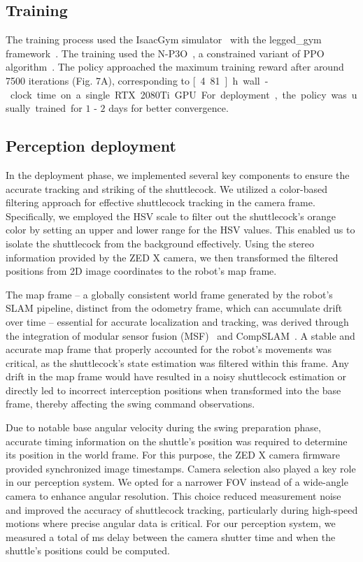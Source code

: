 \documentclass[9pt,twocolumn,twoside]{osajnl}
\begin{document}
\subsection*{Training}
The training process used the IsaacGym simulator~\cite{makoviychuk2021isaac} with the legged\_gym framework~\cite{makoviychuk2021isaac, rudin2022learning}. The training used the \ac{N-P3O}~\cite{lee2023evaluation}, a constrained variant of \ac{PPO} algorithm~\cite{schulman2017proximalpolicyoptimizationalgorithms}. The policy approached the maximum training reward after around 7500 iterations (Fig. 7A), corresponding to \unit[4.81]{h} wall-clock time on a single RTX 2080Ti GPU. For deployment, the policy was usually trained for $1$ - $2$ days for better convergence.

\subsection*{Perception deployment}
In the deployment phase, we implemented several key components to ensure the accurate tracking and striking of the shuttlecock. We utilized a color-based filtering approach for effective shuttlecock tracking in the camera frame. Specifically, we employed the \ac{HSV} scale to filter out the shuttlecock's orange color by setting an upper and lower range for the \ac{HSV} values. This enabled us to isolate the shuttlecock from the background effectively. Using the stereo information provided by the ZED X camera, we then transformed the filtered positions from 2D image coordinates to the robot's map frame.

The map frame -- a globally consistent world frame generated by the robot's \ac{SLAM} pipeline, distinct from the odometry frame, which can accumulate drift over time -- essential for accurate localization and tracking, was derived through the integration of modular sensor fusion (MSF)~\cite{lynen13robust} and CompSLAM~\cite{khattak2020complementary}. A stable and accurate map frame that properly accounted for the robot's movements was critical, as the shuttlecock's state estimation was filtered within this frame. Any drift in the map frame would have resulted in a noisy shuttlecock estimation or directly led to incorrect interception positions when transformed into the base frame, thereby affecting the swing command observations.

Due to notable base angular velocity during the swing preparation phase, accurate timing information on the shuttle's position was required to determine its position in the world frame. For this purpose, the ZED X camera firmware provided synchronized image timestamps. Camera selection also played a key role in our perception system. We opted for a narrower \ac{FOV} instead of a wide-angle camera to enhance angular resolution. This choice reduced measurement noise and improved the accuracy of shuttlecock tracking, particularly during high-speed motions where precise angular data is critical. For our perception system, we measured a total of \unit[60-160]{ms} delay between the camera shutter time and when the shuttle's positions could be computed.
\end{document}
